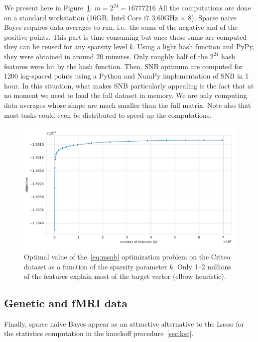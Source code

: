 We present here in Figure~\ref{fig:criteo_hash_elbow}.
$m = 2^{24} = 16777216$
All the computations are done on a standard workstation (16GB, Intel Core i7 3.60GHz $\times$ 8).
Sparse naive Bayes requires data averages to run,
i.e.\ the sums of the negative and of the positive points.
This part is time consuming but once these sums are computed they can be reused for any sparsity level $k$.
Using a light hash function and PyPy, they were obtained in around 20 minutes.
Only roughly half of the $2^{24}$ hash features were hit by the hash function.
Then, SNB optimum are computed for 1200 log-spaced points using a Python and NumPy implementation of SNB in 1 hour.
In this situation, what makes SNB particularly appealing is the fact that at no moment we need to load the full dataset
in memory.
We are only computing data averages whose shape are much smaller than the full matrix.
Note also that most tasks could even be distributed to speed up the computations.
\begin{figure}
    \centering
    \includegraphics[width=0.75\linewidth, height=0.4\linewidth]{figures/criteo_hash_elbow.pdf}
    \caption{
        Optimal value of the~\ref{eq:msnb} optimization problem on the Criteo dataset
        as a function of the sparsity parameter $k$.
        Only 1--2 millions of the features explain most of the target vector (elbow heuristic).
    }
    \label{fig:criteo_hash_elbow}
\end{figure}

\subsection{Genetic and fMRI data}\label{subsec:snb_genetic_fmri}



\bigbreak
Finally, sparse naive Bayes appear as an attractive alternative to the Lasso for the statistics computation
in the knockoff procedure~\ref{sec:ksc}.
